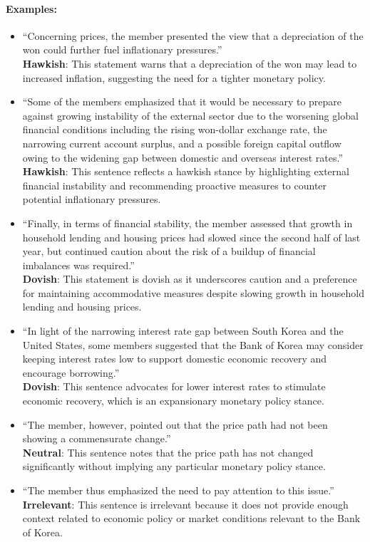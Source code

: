 \paragraph{Examples: }
\begin{itemize}
    \item ``Concerning prices, the member presented the view that a depreciation of the won could further fuel inflationary pressures.''\\
    \textbf{Hawkish}: This statement warns that a depreciation of the won may lead to increased inflation, suggesting the need for a tighter monetary policy.
    
    \item ``Some of the members emphasized that it would be necessary to prepare against growing instability of the external sector due to the worsening global financial conditions including the rising won-dollar exchange rate, the narrowing current account surplus, and a possible foreign capital outflow owing to the widening gap between domestic and overseas interest rates.''\\
    \textbf{Hawkish}: This sentence reflects a hawkish stance by highlighting external financial instability and recommending proactive measures to counter potential inflationary pressures.
    
    \item ``Finally, in terms of financial stability, the member assessed that growth in household lending and housing prices had slowed since the second half of last year, but continued caution about the risk of a buildup of financial imbalances was required.''\\
    \textbf{Dovish}: This statement is dovish as it underscores caution and a preference for maintaining accommodative measures despite slowing growth in household lending and housing prices.
    
    \item ``In light of the narrowing interest rate gap between South Korea and the United States, some members suggested that the Bank of Korea may consider keeping interest rates low to support domestic economic recovery and encourage borrowing.''\\
    \textbf{Dovish}: This sentence advocates for lower interest rates to stimulate economic recovery, which is an expansionary monetary policy stance.

    \item ``The member, however, pointed out that the price path had not been showing a commensurate change.''\\
    \textbf{Neutral}: This sentence notes that the price path has not changed significantly without implying any particular monetary policy stance.
    
    \item ``The member thus emphasized the need to pay attention to this issue.''\\
    \textbf{Irrelevant}: This sentence is irrelevant because it does not provide enough context related to economic policy or market conditions relevant to the Bank of Korea.
\end{itemize}


